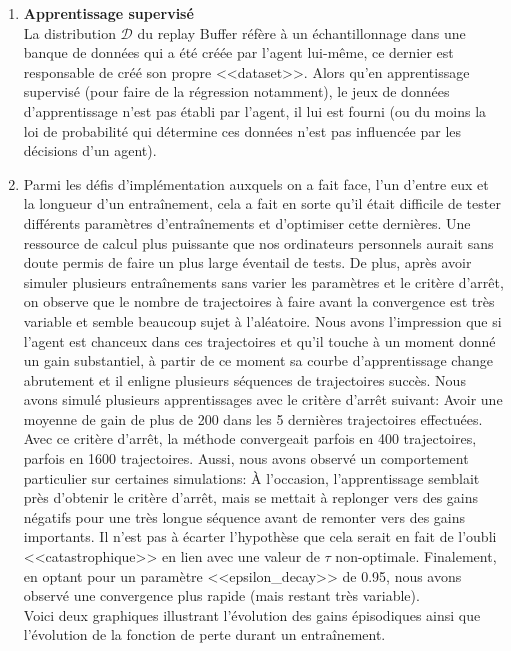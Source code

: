 \documentclass[letterpaper,11pt]{article}
\begin{document}
\begin{enumerate}[label=(\alph*)]
\item \textbf{Apprentissage supervisé}\\
La distribution $\mathcal{D}$ du replay Buffer réfère à un échantillonnage dans une banque de données qui a été créée par l'agent lui-même, ce dernier est responsable de créé son propre <<dataset>>. Alors qu'en apprentissage supervisé (pour faire de la régression notamment), le jeux de données d'apprentissage n'est pas établi par l'agent, il lui est fourni (ou du moins la loi de probabilité qui détermine ces données n'est pas influencée par les décisions d'un agent).

\item Parmi les défis d'implémentation auxquels on a fait face, l'un d'entre eux et la longueur d'un entraînement, cela a fait en sorte qu'il était difficile de tester différents paramètres d'entraînements et d'optimiser cette dernières. Une ressource de calcul plus puissante que nos ordinateurs personnels aurait sans doute permis de faire un plus large éventail de tests. De plus, après avoir simuler plusieurs entraînements sans varier les paramètres et le critère d'arrêt, on observe que le nombre de trajectoires à faire avant la convergence est très variable et semble beaucoup sujet à l'aléatoire. Nous avons l'impression que si l'agent est chanceux dans ces trajectoires et qu'il touche à un moment donné un gain substantiel, à partir de ce moment sa courbe d'apprentissage change abrutement et il enligne plusieurs séquences de trajectoires succès. Nous avons simulé plusieurs apprentissages avec le critère d'arrêt suivant: Avoir une moyenne de gain de plus de 200 dans les 5 dernières trajectoires effectuées. Avec ce critère d'arrêt, la méthode convergeait parfois en 400 trajectoires, parfois en 1600 trajectoires. Aussi, nous avons observé un comportement particulier sur certaines simulations: À l'occasion, l'apprentissage semblait près d'obtenir le critère d'arrêt, mais se mettait à replonger vers des gains négatifs pour une très longue séquence avant de remonter vers des gains importants. Il n'est pas à écarter l'hypothèse que cela serait en fait de l'oubli <<catastrophique>> en lien avec une valeur de $\tau$ non-optimale. Finalement, en optant pour un paramètre <<epsilon\_decay>> de 0.95, nous avons observé une convergence plus rapide (mais restant très variable).\\

Voici deux graphiques illustrant l'évolution des gains épisodiques ainsi que l'évolution de la fonction de perte durant un entraînement.


\end{enumerate}
\end{document}
